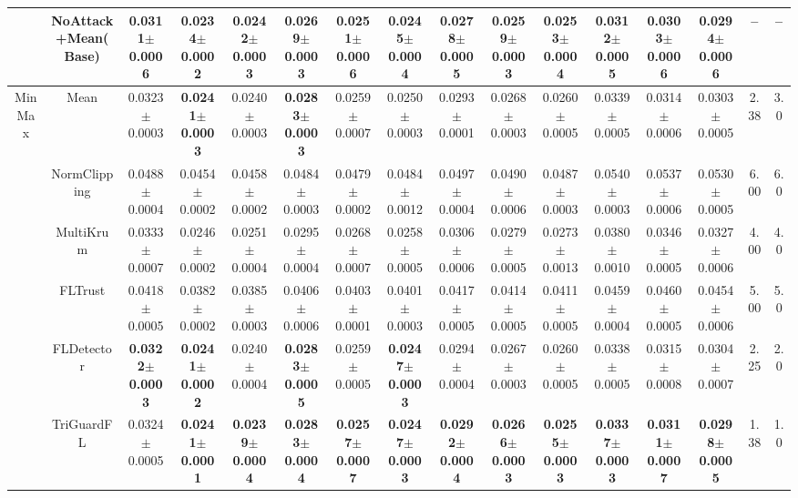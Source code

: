 \begin{table}[t]
\begin{tabular}{c c c c c c c c c c c c c c c c}
 & NoAttack+Mean(Base) & 0.0311$\pm$0.0006 & 0.0234$\pm$0.0002 & 0.0242$\pm$0.0003 & 0.0269$\pm$0.0003 & 0.0251$\pm$0.0006 & 0.0245$\pm$0.0004 & 0.0278$\pm$0.0005 & 0.0259$\pm$0.0003 & 0.0253$\pm$0.0004 & 0.0312$\pm$0.0005 & 0.0303$\pm$0.0006 & 0.0294$\pm$0.0006 & -- & -- \\
\midrule
\multirow{6}{*}{MinMax} & Mean & 0.0323$\pm$0.0003 & \textbf{0.0241$\pm$0.0003} & 0.0240$\pm$0.0003 & \textbf{0.0283$\pm$0.0003} & 0.0259$\pm$0.0007 & 0.0250$\pm$0.0003 & 0.0293$\pm$0.0001 & 0.0268$\pm$0.0003 & 0.0260$\pm$0.0005 & 0.0339$\pm$0.0005 & 0.0314$\pm$0.0006 & 0.0303$\pm$0.0005 & 2.38 & 3.0 \\
 & NormClipping & 0.0488$\pm$0.0004 & 0.0454$\pm$0.0002 & 0.0458$\pm$0.0002 & 0.0484$\pm$0.0003 & 0.0479$\pm$0.0002 & 0.0484$\pm$0.0012 & 0.0497$\pm$0.0004 & 0.0490$\pm$0.0006 & 0.0487$\pm$0.0003 & 0.0540$\pm$0.0003 & 0.0537$\pm$0.0006 & 0.0530$\pm$0.0005 & 6.00 & 6.0 \\
 & MultiKrum & 0.0333$\pm$0.0007 & 0.0246$\pm$0.0002 & 0.0251$\pm$0.0004 & 0.0295$\pm$0.0004 & 0.0268$\pm$0.0007 & 0.0258$\pm$0.0005 & 0.0306$\pm$0.0006 & 0.0279$\pm$0.0005 & 0.0273$\pm$0.0013 & 0.0380$\pm$0.0010 & 0.0346$\pm$0.0005 & 0.0327$\pm$0.0006 & 4.00 & 4.0 \\
 & FLTrust & 0.0418$\pm$0.0005 & 0.0382$\pm$0.0002 & 0.0385$\pm$0.0003 & 0.0406$\pm$0.0006 & 0.0403$\pm$0.0001 & 0.0401$\pm$0.0003 & 0.0417$\pm$0.0005 & 0.0414$\pm$0.0005 & 0.0411$\pm$0.0005 & 0.0459$\pm$0.0004 & 0.0460$\pm$0.0005 & 0.0454$\pm$0.0006 & 5.00 & 5.0 \\
 & FLDetector & \textbf{0.0322$\pm$0.0003} & \textbf{0.0241$\pm$0.0002} & 0.0240$\pm$0.0004 & \textbf{0.0283$\pm$0.0005} & 0.0259$\pm$0.0005 & \textbf{0.0247$\pm$0.0003} & 0.0294$\pm$0.0004 & 0.0267$\pm$0.0003 & 0.0260$\pm$0.0005 & 0.0338$\pm$0.0005 & 0.0315$\pm$0.0008 & 0.0304$\pm$0.0007 & 2.25 & 2.0 \\
 & \cellcolor{mygray}TriGuardFL & \cellcolor{mygray}0.0324$\pm$0.0005 & \cellcolor{mygray}\textbf{0.0241$\pm$0.0001} & \cellcolor{mygray}\textbf{0.0239$\pm$0.0004} & \cellcolor{mygray}\textbf{0.0283$\pm$0.0004} & \cellcolor{mygray}\textbf{0.0257$\pm$0.0007} & \cellcolor{mygray}\textbf{0.0247$\pm$0.0003} & \cellcolor{mygray}\textbf{0.0292$\pm$0.0004} & \cellcolor{mygray}\textbf{0.0266$\pm$0.0003} & \cellcolor{mygray}\textbf{0.0255$\pm$0.0003} & \cellcolor{mygray}\textbf{0.0337$\pm$0.0003} & \cellcolor{mygray}\textbf{0.0311$\pm$0.0007} & \cellcolor{mygray}\textbf{0.0298$\pm$0.0005} & \cellcolor{mygray}1.38 & \cellcolor{mygray}1.0 \\

\end{tabular}
\end{table}
